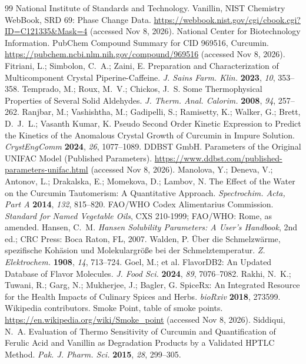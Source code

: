 \documentclass[journal=jceaax,manuscript=article,layout=twocolumn]{achemso}
\begin{document}
\begin{thebibliography}{99}
 National Institute of Standards and Technology. Vanillin, NIST Chemistry WebBook, SRD 69: Phase Change Data. \url{https://webbook.nist.gov/cgi/cbook.cgi?ID=C121335&Mask=4} (accessed Nov 8, 2026).
 National Center for Biotechnology Information. PubChem Compound Summary for CID 969516, Curcumin. \url{https://pubchem.ncbi.nlm.nih.gov/compound/969516} (accessed Nov 8, 2026).
 Fitriani, L.; Simbolon, C.~A.; Zaini, E. Preparation and Characterization of Multicomponent Crystal Piperine-Caffeine. \textit{J. Sains Farm. Klin.} \textbf{2023}, \textit{10}, 353--358.
 Temprado, M.; Roux, M.~V.; Chickos, J.~S. Some Thermophysical Properties of Several Solid Aldehydes. \textit{J. Therm. Anal. Calorim.} \textbf{2008}, \textit{94}, 257--262.
 Ranjbar, M.; Vashishtha, M.; Gadipelli, S.; Ramisetty, K.; Walker, G.; Brett, D.~J.~L.; Vasanth Kumar, K. Pseudo Second Order Kinetic Expression to Predict the Kinetics of the Anomalous Crystal Growth of Curcumin in Impure Solution. \textit{CrystEngComm} \textbf{2024}, \textit{26}, 1077--1089.
 DDBST GmbH. Parameters of the Original UNIFAC Model (Published Parameters). \url{https://www.ddbst.com/published-parameters-unifac.html} (accessed Nov 8, 2026).
 Manolova, Y.; Deneva, V.; Antonov, L.; Drakalska, E.; Momekova, D.; Lambov, N. The Effect of the Water on the Curcumin Tautomerism: A Quantitative Approach. \textit{Spectrochim. Acta, Part A} \textbf{2014}, \textit{132}, 815--820.
 FAO/WHO Codex Alimentarius Commission. \textit{Standard for Named Vegetable Oils}, CXS 210-1999; FAO/WHO: Rome, as amended.
 Hansen, C.~M. \textit{Hansen Solubility Parameters: A User's Handbook}, 2nd ed.; CRC Press: Boca Raton, FL, 2007.
 Walden, P. \"Uber die Schmelzw\"arme, spezifische Koh\"asion und Molekulargr\"o\ss e bei der Schmelztemperatur. \textit{Z. Elektrochem.} \textbf{1908}, \textit{14}, 713--724.
 Goel, M.; et al. FlavorDB2: An Updated Database of Flavor Molecules. \textit{J. Food Sci.} \textbf{2024}, \textit{89}, 7076--7082.
 Rakhi, N.~K.; Tuwani, R.; Garg, N.; Mukherjee, J.; Bagler, G. SpiceRx: An Integrated Resource for the Health Impacts of Culinary Spices and Herbs. \textit{bioRxiv} \textbf{2018}, 273599.
 Wikipedia contributors. Smoke Point, table of smoke points. \url{https://en.wikipedia.org/wiki/Smoke_point} (accessed Nov 8, 2026).
 Siddiqui, N.~A. Evaluation of Thermo Sensitivity of Curcumin and Quantification of Ferulic Acid and Vanillin as Degradation Products by a Validated HPTLC Method. \textit{Pak. J. Pharm. Sci.} \textbf{2015}, \textit{28}, 299--305.

\end{thebibliography}
\end{document}
